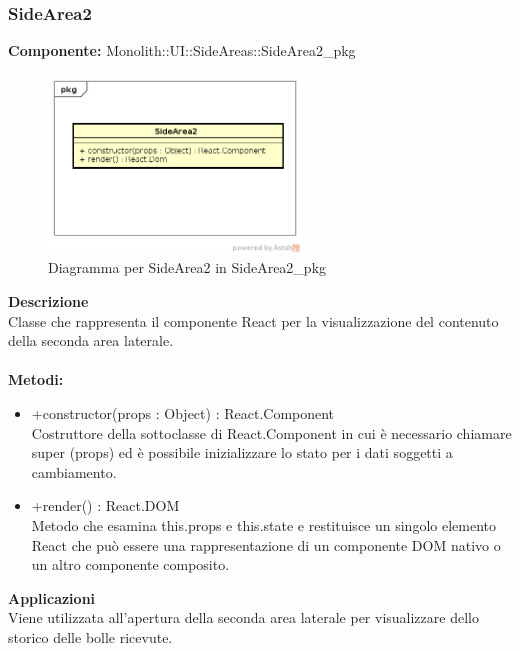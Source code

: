 \subsubsection{SideArea2}
\textbf{Componente:}  Monolith::UI::SideAreas::SideArea2\_pkg\\
   \FloatBarrier
   \begin{figure}[ht]
   \centering
   \includegraphics[width=0.6\textwidth]{img/single-SideArea2}
   \caption{{Diagramma per SideArea2 in SideArea2\_pkg}}
\end{figure}
\FloatBarrier
\textbf{Descrizione}\\
Classe che rappresenta il componente React per la visualizzazione del contenuto della seconda area laterale. \\\\
\textbf{Metodi:} \begin{itemize}\item +constructor(props : Object) : React.Component \\Costruttore della sottoclasse di React.Component in cui è necessario chiamare super (props) ed è possibile inizializzare lo stato per i dati soggetti a cambiamento.\item +render() : React.DOM \\Metodo che esamina this.props e this.state e restituisce un singolo elemento React che può essere una rappresentazione di un componente DOM nativo o un altro componente composito.

\end{itemize} 


\textbf{Applicazioni}\\
Viene utilizzata all'apertura della seconda area laterale per visualizzare dello storico delle bolle ricevute. 


\clearpage

